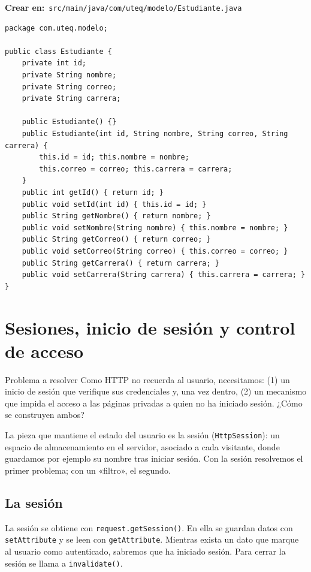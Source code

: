 \documentclass[11pt]{article}
\begin{document}
{\small\color{jwebazulo}\textbf{Crear en:}~}\texttt{src/\allowbreak{}main/\allowbreak{}java/\allowbreak{}com/\allowbreak{}uteq/\allowbreak{}modelo/\allowbreak{}Estudiante.\allowbreak{}java}\par\nobreak\vspace{-1pt}
\begin{cajacodigo}
\begin{lstlisting}[style=java]
package com.uteq.modelo;

public class Estudiante {
    private int id;
    private String nombre;
    private String correo;
    private String carrera;

    public Estudiante() {}
    public Estudiante(int id, String nombre, String correo, String carrera) {
        this.id = id; this.nombre = nombre;
        this.correo = correo; this.carrera = carrera;
    }
    public int getId() { return id; }
    public void setId(int id) { this.id = id; }
    public String getNombre() { return nombre; }
    public void setNombre(String nombre) { this.nombre = nombre; }
    public String getCorreo() { return correo; }
    public void setCorreo(String correo) { this.correo = correo; }
    public String getCarrera() { return carrera; }
    public void setCarrera(String carrera) { this.carrera = carrera; }
}
\end{lstlisting}
\end{cajacodigo}
\vspace{2pt}
\section{Sesiones, inicio de sesión y control de acceso}
\begin{cajaproblema}{Problema a resolver}
Como HTTP no recuerda al usuario, necesitamos: (1) un inicio de sesión que verifique sus credenciales y, una vez dentro, (2) un mecanismo que impida el acceso a las páginas privadas a quien no ha iniciado sesión. ¿Cómo se construyen ambos?\par
\end{cajaproblema}
La pieza que mantiene el estado del usuario es la sesión (\texttt{Http\allowbreak{}Session}): un espacio de almacenamiento en el servidor, asociado a cada visitante, donde guardamos por ejemplo su nombre tras iniciar sesión. Con la sesión resolvemos el primer problema; con un «filtro», el segundo.

\subsection{La sesión}
La sesión se obtiene con \texttt{request.\allowbreak{}get\allowbreak{}Session()}. En ella se guardan datos con \texttt{set\allowbreak{}Attribute} y se leen con \texttt{get\allowbreak{}Attribute}. Mientras exista un dato que marque al usuario como autenticado, sabremos que ha iniciado sesión. Para cerrar la sesión se llama a \texttt{invalidate()}.
\end{document}

